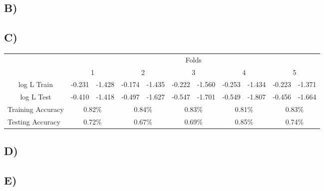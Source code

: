 \documentclass{report}
\begin{document}
\subsection*{B)}
\subsection*{C)}
\begin{center}
\begin{table}[h]
 \begin{tabular}{l|l|l|l|l|l|l|l|l|l|l|}
 \cline{2-11}
     & \multicolumn{10}{c|}{Folds}      \\ \cline{2-11}
     & \multicolumn{2}{c|}{1} & \multicolumn{2}{c|}{2} & \multicolumn{2}{c|}{3} & \multicolumn{2}{c|}{4} & \multicolumn{2}{c|}{5} \\ \hline
\multicolumn{1}{|c|}{log L Train} & -0.231 & -1.428 & -0.174 & -1.435 & -0.222 & -1.560 & -0.253 & -1.434 & -0.223 & -1.371 \\ \hline
\multicolumn{1}{|c|}{log L Test} & -0.410 & -1.418 & -0.497 & -1.627 & -0.547 & -1.701 & -0.549 & -1.807 & -0.456 & -1.664 \\ \hline
\multicolumn{1}{|l|}{Training Accuracy} & \multicolumn{2}{c|}{0.82\%} & \multicolumn{2}{c|}{0.84\%} & \multicolumn{2}{c|}{0.83\%} & \multicolumn{2}{c|}{0.81\%} & \multicolumn{2}{c|}{0.83\%} \\ \hline
\multicolumn{1}{|l|}{Testing Accuracy} & \multicolumn{2}{c|}{0.72\%} & \multicolumn{2}{c|}{0.67\%} & \multicolumn{2}{c|}{0.69\%} & \multicolumn{2}{c|}{0.85\%} & \multicolumn{2}{c|}{0.74\%} \\ \hline
\end{tabular}
\end{table}
\end{center}
\subsection*{D)}
\subsection*{E)}
\end{document}
